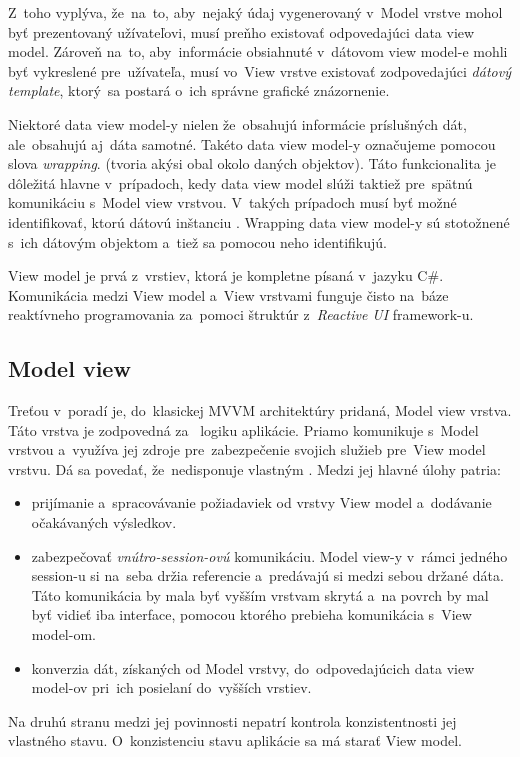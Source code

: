 \begin{itemize}
    Z~toho vyplýva, že~na~to, aby~nejaký údaj vygenerovaný v~Model vrstve mohol byť prezentovaný užívateľovi, musí preňho existovať odpovedajúci data view model. Zároveň na~to, aby~informácie obsiahnuté v~dátovom view model-e mohli byť vykreslené pre~užívateľa, musí vo~View vrstve existovať zodpovedajúci \textit{dátový template}, ktorý~sa postará o~ich správne grafické znázornenie.

    Niektoré data view model-y nielen že~obsahujú informácie príslušných dát, ale~obsahujú aj~dáta samotné. Takéto data view model-y označujeme pomocou slova \textit{wrapping}. (tvoria akýsi obal okolo daných objektov). Táto funkcionalita je dôležitá hlavne v~prípadoch, kedy data view model slúži taktiež pre~spätnú komunikáciu s~Model view vrstvou. V~takých prípadoch musí byť možné identifikovať, ktorú dátovú inštanciu . Wrapping data view model-y sú stotožnené s~ich dátovým objektom a~tiež sa pomocou neho identifikujú.  
\end{itemize}


View model je prvá z~vrstiev, ktorá je kompletne písaná v~jazyku C\#. Komunikácia medzi View model a~View vrstvami funguje čisto na~báze reaktívneho programovania za~pomoci štruktúr z~\textit{Reactive UI} framework-u.  

\subsection{Model view}

Treťou v~poradí je, do~klasickej MVVM architektúry pridaná, Model view vrstva. Táto vrstva je zodpovedná za~ logiku aplikácie. Priamo komunikuje s~Model vrstvou a~využíva jej zdroje pre~zabezpečenie svojich služieb pre~View model vrstvu. Dá sa povedať, že~nedisponuje vlastným . Medzi jej hlavné úlohy patria:  
\begin{itemize}
    \item prijímanie a~spracovávanie požiadaviek od vrstvy View model a~dodávanie očakávaných výsledkov.  
    \item zabezpečovať \textit{vnútro-session-ovú} komunikáciu. Model view-y v~rámci jedného session-u si na~seba držia referencie a~predávajú si medzi sebou držané dáta. Táto komunikácia by mala byť vyšším vrstvam skrytá a~na povrch by mal byť vidieť iba interface, pomocou ktorého prebieha komunikácia s~View model-om.
    \item konverzia dát, získaných od Model vrstvy, do~odpovedajúcich data view model-ov pri~ich posielaní do~vyšších vrstiev.  
\end{itemize}
Na druhú stranu medzi jej povinnosti nepatrí kontrola konzistentnosti jej vlastného stavu. O~konzistenciu stavu aplikácie sa má starať View model.

